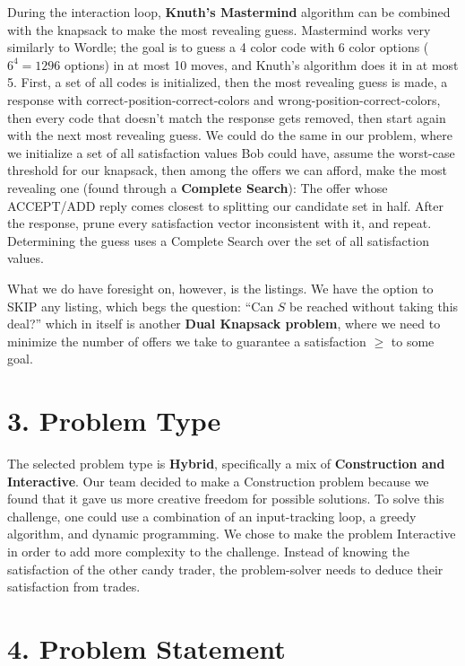 \documentclass[11pt]{article}
\begin{document}
During the interaction loop, \textbf{Knuth's Mastermind} algorithm can be combined
with the knapsack to make the most revealing guess. Mastermind works very
similarly to Wordle; the goal is to guess a 4 color code with 6 color options
($6^4 = 1296$ options) in at most 10 moves, and Knuth's algorithm does it in
at most 5. First, a set of all codes is initialized, then the most revealing
guess is made, a response with correct-position-correct-colors and
wrong-position-correct-colors, then every code that doesn't match the
response gets removed, then start again with the next most revealing guess.
We could do the same in our problem, where we initialize a set of all
satisfaction values Bob could have, assume the worst-case threshold for our
knapsack, then among the offers we can afford, make the most revealing one
(found through a \textbf{Complete Search}): The offer whose ACCEPT/ADD
reply comes closest to splitting our candidate set in half. After the response,
prune every satisfaction vector inconsistent with it, and repeat.
Determining the guess uses a Complete Search over the set of all satisfaction values.

What we do have foresight on, however, is the listings. We have the option to SKIP any
listing, which begs the question: ``Can $S$ be reached without taking this
deal?'' which in itself is another \textbf{Dual Knapsack problem}, where we need to minimize
the number of offers we take to guarantee a satisfaction $\geq$ to some
goal.

\section*{3. Problem Type}

The selected problem type is \textbf{Hybrid}, specifically a mix of \textbf{Construction and
Interactive}. Our team decided to make a Construction problem because we found
that it gave us more creative freedom for possible solutions. To solve this
challenge, one could use a combination of an input-tracking loop, a greedy
algorithm, and dynamic programming. We chose to make the problem Interactive
in order to add more complexity to the challenge. Instead of knowing the
satisfaction of the other candy trader, the problem-solver needs to deduce
their satisfaction from trades.

\section*{4. Problem Statement}
\end{document}
